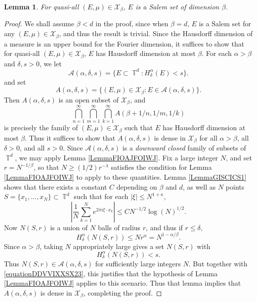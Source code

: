 \documentclass[dvipsnames,letterpaper,12pt]{article}
\numberwithin{equation}{section}
\DeclareMathOperator{\TT}{\mathbb{T}}
\newtheorem{lemma}[theorem]{Lemma}
\numberwithin{theorem}{section}
\begin{document}
\begin{lemma} \label{lemmaoiajdoijwdowaj}
    For quasi-all $(E,\mu) \in \mathcal{X}_\beta$, $E$ is a Salem set of dimension $\beta$.
\end{lemma}
\begin{proof}
    We shall assume $\beta < d$ in the proof, since when $\beta = d$, $E$ is a Salem set for any $(E,\mu) \in \mathcal{X}_\beta$, and thus the result is trivial. Since the Hausdorff dimension of a measure is an upper bound for the Fourier dimension, it suffices to show that for quasi-all $(E,\mu) \in \mathcal{X}_\beta$, $E$ has Hausdorff dimension at most $\beta$. For each $\alpha > \beta$ and $\delta, s > 0$, we let
    \[ \mathcal{A}(\alpha,\delta,s) = \{ E \subset \TT^d: H^\alpha_\delta(E) < s \}. \]
    and set
    \[ A(\alpha,\delta,s) = \{ (E,\mu) \in \mathcal{X}_\beta: E \in \mathcal{A}(\alpha,\delta,s) \}. \]
    Then $A(\alpha,\delta,s)$ is an open subset of $\mathcal{X}_\beta$, and
    \begin{equation}
        \bigcap_{n = 1}^\infty \bigcap_{m = 1}^\infty \bigcap_{k = 1}^\infty A(\beta + 1/n, 1/m, 1/k)
    \end{equation}
    is precisely the family of $(E,\mu) \in \mathcal{X}_\beta$ such that $E$ has Hausdorff dimension at most $\beta$. Thus it suffices to show that $A(\alpha,\delta,s)$ is dense in $\mathcal{X}_\beta$ for all $\alpha > \beta$, all $\delta > 0$, and all $s > 0$. Since $\mathcal{A}(\alpha,\delta,s)$ is a \emph{downward closed} family of subsets of $\TT^d$, we may apply Lemma \ref{LemmaFIOAJFOIWJ}. Fix a large integer $N$, and set $r = N^{-1/\beta}$, so that $N \geq (1/2) r^{-\lambda}$ satisfies the condition for Lemma \ref{LemmaFIOAJFOIWJ} to apply to these quantities. Lemma \ref{LemmaGISCICS1} shows that there exists a constant $C$ depending on $\beta$ and $d$, as well as $N$ points $S = \{ x_1, \dots, x_N \} \subset \TT^d$ such that for each $|\xi| \leq N^{1 + \kappa}$,
    \begin{equation} \label{equationDDVVIXXSX23}
        \left| \frac{1}{N} \sum_{k = 1}^N e^{2 \pi i \xi \cdot x_k} \right| \leq C N^{-1/2} \log(N)^{1/2}.
    \end{equation}
    Now $N(S,r)$ is a union of $N$ balls of radius $r$, and thus if $r \leq \delta$,
    \begin{equation}
        H^\alpha_\delta(N(S,r)) \leq N r^\alpha = N^{1 - \alpha / \beta}.
    \end{equation}
    Since $\alpha > \beta$, taking $N$ appropriately large gives a set $N(S,r)$ with
    \begin{equation}
        H^\alpha_\delta(N(S,r)) < s.
    \end{equation}
    Thus $N(S,r) \in \mathcal{A}(\alpha,\delta,s)$ for sufficiently large integers $N$. But together with \eqref{equationDDVVIXXSX23}, this justifies that the hypothesis of Lemma \ref{LemmaFIOAJFOIWJ} applies to this scenario. Thus that lemma implies that $A(\alpha,\delta,s)$ is dense in $\mathcal{X}_\beta$, completing the proof.
\end{proof}
\end{document}

